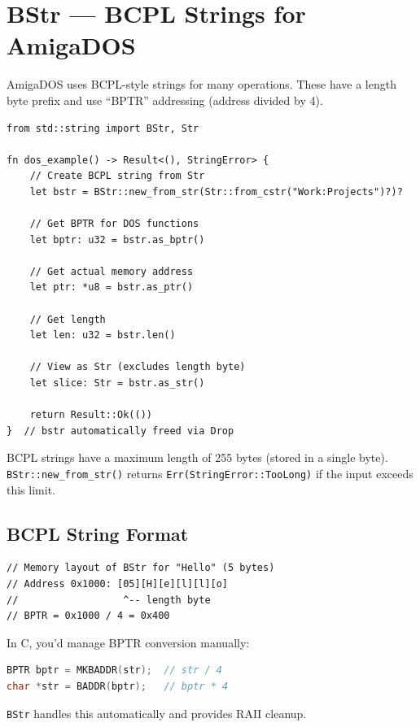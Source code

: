 \section{BStr --- BCPL Strings for AmigaDOS}
\label{sec:bstr}

AmigaDOS uses BCPL-style strings for many operations. These have a length byte prefix and use ``BPTR'' addressing (address divided by 4).

\begin{lstlisting}
from std::string import BStr, Str

fn dos_example() -> Result<(), StringError> {
    // Create BCPL string from Str
    let bstr = BStr::new_from_str(Str::from_cstr("Work:Projects")?)?

    // Get BPTR for DOS functions
    let bptr: u32 = bstr.as_bptr()

    // Get actual memory address
    let ptr: *u8 = bstr.as_ptr()

    // Get length
    let len: u32 = bstr.len()

    // View as Str (excludes length byte)
    let slice: Str = bstr.as_str()

    return Result::Ok(())
}  // bstr automatically freed via Drop
\end{lstlisting}

\begin{warningbox}
BCPL strings have a maximum length of 255 bytes (stored in a single byte). \texttt{BStr::new\_from\_str()} returns \texttt{Err(StringError::TooLong)} if the input exceeds this limit.
\end{warningbox}

\subsection{BCPL String Format}

\begin{lstlisting}
// Memory layout of BStr for "Hello" (5 bytes)
// Address 0x1000: [05][H][e][l][l][o]
//                  ^-- length byte
// BPTR = 0x1000 / 4 = 0x400
\end{lstlisting}

\begin{comingfromc}
In C, you'd manage BPTR conversion manually:
\begin{lstlisting}[language=C]
BPTR bptr = MKBADDR(str);  // str / 4
char *str = BADDR(bptr);   // bptr * 4
\end{lstlisting}
\texttt{BStr} handles this automatically and provides RAII cleanup.
\end{comingfromc}

